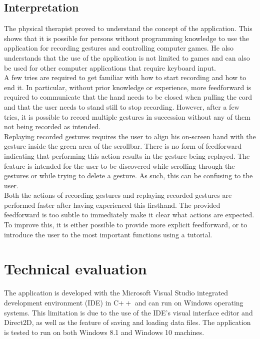 \subsection{Interpretation}

The physical therapist proved to understand the concept of the application. This shows that it is possible for persons without programming knowledge to use the application for recording gestures and controlling computer games. He also understands that the use of the application is not limited to games and can also be used for other computer applications that require keyboard input.\\

A few tries are required to get familiar with how to start recording and how to end it. In particular, without prior knowledge or experience, more feedforward is required to communicate that the hand needs to be closed when pulling the cord and that the user needs to stand still to stop recording. However, after a few tries, it is possible to record multiple gestures in succession without any of them not being recorded as intended.\\

Replaying recorded gestures requires the user to align his on-screen hand with the gesture inside the green area of the scrollbar. There is no form of feedforward indicating that performing this action results in the gesture being replayed. The feature is intended for the user to be discovered while scrolling through the gestures or while trying to delete a gesture. As such, this can be confusing to the user.\\

Both the actions of recording gestures and replaying recorded gestures are performed faster after having experienced this firsthand. The provided feedforward is too subtle to immediately make it clear what actions are expected. To improve this, it is either possible to provide more explicit feedforward, or to introduce the user to the most important functions using a tutorial.\\


\section{Technical evaluation}

The application is developed with the Microsoft Visual Studio integrated development environment (IDE) in C$++$ and can run on Windows operating systems. This limitation is due to the use of the IDE's visual interface editor and Direct2D, as well as the feature of saving and loading data files. The application is tested to run on both Windows 8.1 and Windows 10 machines.\\

